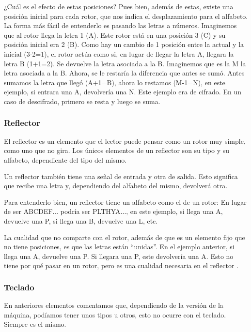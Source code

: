 ¿Cuál es el efecto de estas posiciones?
Pues bien, además de estas, existe una posición inicial para cada rotor,
que nos indica el desplazamiento para el alfabeto.
La forma más fácil de entenderlo es pasando las letras a números.
Imaginemos que al rotor llega la letra 1 (A).
Este rotor está en una posición 3 (C) y su posición inicial era 2 (B).
Como hay un cambio de 1 posición entre la actual y la inicial (3-2=1),
el rotor actúa como si, en lugar de llegar la letra A, llegara la letra B (1+1=2).
Se devuelve la letra asociada a la B. Imaginemos que es la M la letra asociada a la B.
Ahora, se le restaría la diferencia que antes se sumó. Antes sumamos la letra que llegó (A+1=B),
ahora lo restamos (M-1=N), en este ejemplo, si entrara una A,
devolvería una N. Este ejemplo era de cifrado.
En un caso de descifrado, primero se resta y luego se suma.

\subsubsection {Reflector}

El reflector es un elemento que el lector
puede pensar como un rotor muy simple,
como uno que no gira. Los únicos elementos de un reflector son su tipo y su alfabeto,
dependiente del tipo del mismo.


Un reflector también tiene una señal de entrada y otra de salida. Esto significa
que recibe una letra y, dependiendo del alfabeto del mismo, devolverá otra.


Para entenderlo bien, un reflector tiene un alfabeto como el de un rotor:
En lugar de ser ABCDEF... podría ser PLTHYA...,
en este ejemplo, si llega una A, devuelve una P, si llega una B, devuelve una L, etc.


La cualidad que no comparte con el rotor,
además de que es un elemento fijo que no tiene posiciones,
es que las letras están “unidas”. En el ejemplo anterior, si llega una A,
devuelve una P. Si llegara una P, este devolvería una A.
Esto no tiene por qué pasar en un rotor, pero es una cualidad necesaria en el reflector \cite{wiki_enigma_rotor}.

\subsubsection {Teclado}

En anteriores elementos comentamos que, dependiendo de la versión de la máquina, podíamos tener unos tipos u otros, esto no ocurre con el teclado. Siempre es el mismo.


